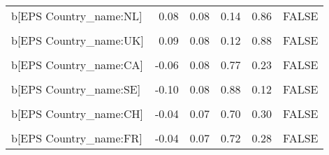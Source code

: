 \begin{table}
\begin{tabular}[t]{lrrrrl}
b[EPS Country\_name:NL] & 0.08 & 0.08 & 0.14 & 0.86 & FALSE\\
\cellcolor{gray!10}{b[(Intercept) Country\_name:UK]} & \cellcolor{gray!10}{0.07} & \cellcolor{gray!10}{0.22} & \cellcolor{gray!10}{0.37} & \cellcolor{gray!10}{0.63} & \cellcolor{gray!10}{FALSE}\\
b[EPS Country\_name:UK] & 0.09 & 0.08 & 0.12 & 0.88 & FALSE\\
\cellcolor{gray!10}{b[(Intercept) Country\_name:CA]} & \cellcolor{gray!10}{-0.05} & \cellcolor{gray!10}{0.21} & \cellcolor{gray!10}{0.60} & \cellcolor{gray!10}{0.40} & \cellcolor{gray!10}{FALSE}\\
b[EPS Country\_name:CA] & -0.06 & 0.08 & 0.77 & 0.23 & FALSE\\
\cellcolor{gray!10}{b[(Intercept) Country\_name:SE]} & \cellcolor{gray!10}{-0.07} & \cellcolor{gray!10}{0.23} & \cellcolor{gray!10}{0.62} & \cellcolor{gray!10}{0.38} & \cellcolor{gray!10}{FALSE}\\
b[EPS Country\_name:SE] & -0.10 & 0.08 & 0.88 & 0.12 & FALSE\\
\cellcolor{gray!10}{b[(Intercept) Country\_name:CH]} & \cellcolor{gray!10}{-0.03} & \cellcolor{gray!10}{0.21} & \cellcolor{gray!10}{0.55} & \cellcolor{gray!10}{0.45} & \cellcolor{gray!10}{FALSE}\\
b[EPS Country\_name:CH] & -0.04 & 0.07 & 0.70 & 0.30 & FALSE\\
\cellcolor{gray!10}{b[(Intercept) Country\_name:FR]} & \cellcolor{gray!10}{-0.03} & \cellcolor{gray!10}{0.21} & \cellcolor{gray!10}{0.56} & \cellcolor{gray!10}{0.44} & \cellcolor{gray!10}{FALSE}\\
b[EPS Country\_name:FR] & -0.04 & 0.07 & 0.72 & 0.28 & FALSE\\
\bottomrule
\end{tabular}
\end{table}
